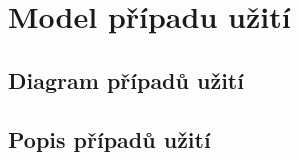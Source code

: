 \section{Model případu užití}

\subsection{Diagram případů užití}

\subsection{Popis případů užití}

